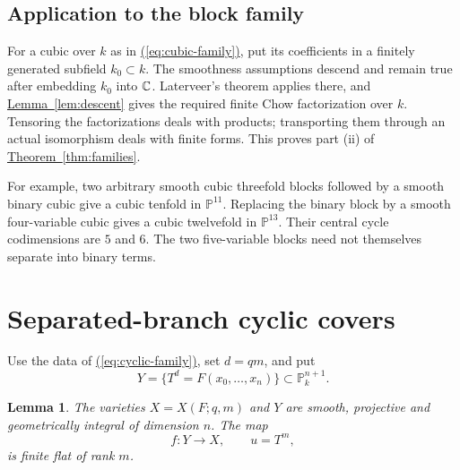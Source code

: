 \documentclass[11pt,a4paper]{article}
\newtheorem{lemma}[theorem]{Lemma}
\theoremstyle{definition}
\theoremstyle{remark}\newtheorem{remark}[theorem]{Remark}
\numberwithin{equation}{section}
\newcommand{\PP}{\mathbb P}\newcommand{\LL}{\mathbb L}
\newcommand{\thmref}[1]{\hyperref[#1]{\textcolor{resultlink}{Theorem~\ref*{#1}}}}
\newcommand{\lemref}[1]{\hyperref[#1]{\textcolor{resultlink}{Lemma~\ref*{#1}}}}
\renewcommand{\eqref}[1]{\hyperref[#1]{\textcolor{equationlink}{(\ref*{#1})}}}
\begin{document}
\subsection{Application to the block family}\label{proof:cubic}

For a cubic over $k$ as in \eqref{eq:cubic-family}, put its
coefficients in a finitely generated subfield $k_0\subset k$.
The smoothness assumptions descend and remain true after
embedding $k_0$ into $\mathbb C$. Laterveer's theorem applies there,
and \lemref{lem:descent} gives the required finite Chow
factorization over $k$. Tensoring the factorizations deals
with products; transporting them through an actual isomorphism
deals with finite forms. This proves part (ii) of
\thmref{thm:families}.

For example, two arbitrary smooth cubic threefold blocks followed
by a smooth binary cubic give a cubic tenfold in $\PP^{11}$.
Replacing the binary block by a smooth four-variable cubic
gives a cubic twelvefold in $\PP^{13}$. Their central cycle
codimensions are $5$ and $6$. The two five-variable blocks
need not themselves separate into binary terms.

\section{Separated-branch cyclic covers}\label{sec:cyclic}

Use the data of \eqref{eq:cyclic-family}, set $d=qm$, and put
\[
                  Y=\{T^d=F(x_0,\ldots,x_n)\}\subset\PP^{n+1}_k.
\]

\begin{lemma}\label{lem:cyclic-cover}
The varieties $X=X(F;q,m)$ and $Y$ are smooth, projective and
geometrically integral of dimension $n$. The map
\begin{equation}\label{eq:finite-cyclic}
                    f:Y\longrightarrow X,\qquad u=T^m,
\end{equation}
is finite flat of rank $m$.
\end{lemma}
\end{document}
